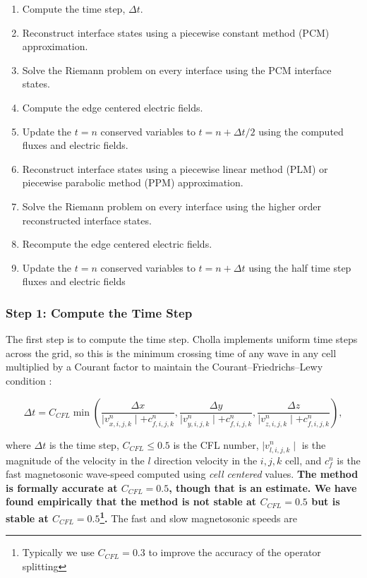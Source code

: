 \documentclass[modern, linenumbers]{aastex631}
\begin{document}
\begin{enumerate}
    \item Compute the time step, $\Delta t$.
    \item Reconstruct interface states using a piecewise constant method (PCM) approximation.
    \item Solve the Riemann problem on every interface using the PCM interface states.
    \item Compute the edge centered electric fields.
    \item Update the $t=n$ conserved variables to $t=n+\Delta t/2$ using the computed fluxes and electric fields.
    \item Reconstruct interface states using a piecewise linear method (PLM) or piecewise parabolic method (PPM) approximation.
    \item Solve the Riemann problem on every interface using the higher order reconstructed interface states.
    \item Recompute the edge centered electric fields.
    \item Update the $t=n$ conserved variables to $t=n+\Delta t$ using the half time step fluxes and electric fields
\end{enumerate}


\subsubsection{Step 1: Compute the Time Step}
\label{vlct:dt}

The first step is to compute the time step. Cholla implements uniform time steps across the grid, so this is the minimum crossing time of any wave in any cell multiplied by a Courant factor to maintain the Courant–Friedrichs–Lewy condition \cite{cfl}:

\begin{equation}
        \label{eqn:dt}
        \Delta t = C_{CFL} \min \left(
            \frac{\Delta x}{\mid v^n_{x,i,j,k} \mid + c^n_{f,i,j,k}},
            \frac{\Delta y}{\mid v^n_{y,i,j,k} \mid + c^n_{f,i,j,k}},
            \frac{\Delta z}{\mid v^n_{z,i,j,k} \mid + c^n_{f,i,j,k}}
        \right),
\end{equation}

\noindent where $\Delta t$ is the time step, $C_{CFL} \leq 0.5$ is the CFL number, $\mid v^n_{l,i,j,k}\mid $ is the magnitude of the velocity in the $l$ direction velocity in the ${i,j,k}$ cell, and $c^n_f $ is the fast magnetosonic wave-speed computed using \emph{cell centered} values. \textbf{The method is formally accurate at $C_{CFL} = 0.5$, though that is an estimate\citep{stone_2009}. We have found empirically that the method is not stable at $C_{CFL} = 0.5$ but is stable at $C_{CFL} = 0.5$\footnote{Typically we use $C_{CFL} = 0.3$ to improve the accuracy of the operator splitting}.} The fast and slow magnetosonic speeds are
\end{document}
